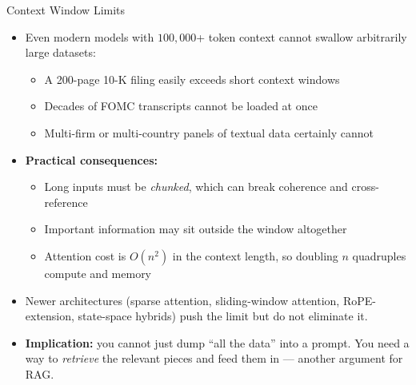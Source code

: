 \begin{frame}{Context Window Limits}
\begin{itemize}
\item Even modern models with $100{,}000$+ token context cannot swallow arbitrarily large datasets:
\begin{itemize}
    \item A 200-page 10-K filing easily exceeds short context windows
    \item Decades of FOMC transcripts cannot be loaded at once
    \item Multi-firm or multi-country panels of textual data certainly cannot
\end{itemize}

\medskip
\item \textbf{Practical consequences:}
\begin{itemize}
    \item Long inputs must be \emph{chunked}, which can break coherence and cross-reference
    \item Important information may sit outside the window altogether
    \item Attention cost is $O(n^2)$ in the context length, so doubling $n$ quadruples compute and memory
\end{itemize}

\medskip
\item Newer architectures (sparse attention, sliding-window attention, RoPE-extension, state-space hybrids) push the limit but do not eliminate it.

\medskip
\item \textbf{Implication:} you cannot just dump ``all the data'' into a prompt. You need a way to \emph{retrieve} the relevant pieces and feed them in --- another argument for RAG.
\end{itemize}
\end{frame}

